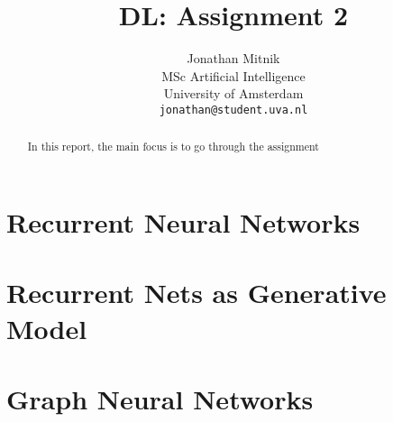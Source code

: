 \documentclass{article}
\title{DL: Assignment 2}
\author{%
  Jonathan Mitnik \\
  MSc Artificial Intelligence\\
  University of Amsterdam\\
  \texttt{jonathan@student.uva.nl} \\
}
\begin{document}
\maketitle

\begin{abstract}
    In this report, the main focus is to go through the assignment
\end{abstract}

\section{Recurrent Neural Networks}


\section{Recurrent Nets as Generative Model}


\section{Graph Neural Networks}

\end{document}
